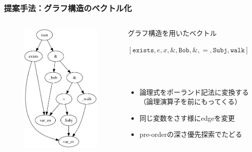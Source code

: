 \documentclass[dvipdfmx]{beamer}
\newcommand{\LF}[1]{\ensuremath{\texttt{#1}}}
\begin{document}
\begin{frame}
\frametitle{提案手法：グラフ構造のベクトル化}
\begin{columns}[t]
    \begin{column}{0.4\textwidth} %
        \begin{figure}[h]
        	\includegraphics[width=4cm]{graph.png}
                \label{fig:graph}
        \end{figure}
    \end{column}
    \begin{column}{0.6\textwidth} %
      \begin{block}{グラフ構造を用いたベクトル}
        \begin{center}
         $[\LF{exists},e,x,\&,\LF{Bob},\&,=,\LF{Subj},\LF{walk}]$
         \end{center}
      \end{block}
      \\~\
      \begin{itemize}
        \item 論理式をポーランド記法に変換する\\（論理演算子を前にもってくる）
        \item 同じ変数をさす様にedgeを変更
        \item pre-orderの深さ優先探索でたどる
      \end{itemize}
    \end{column}
\end{columns}

\end{frame}
\end{document}

